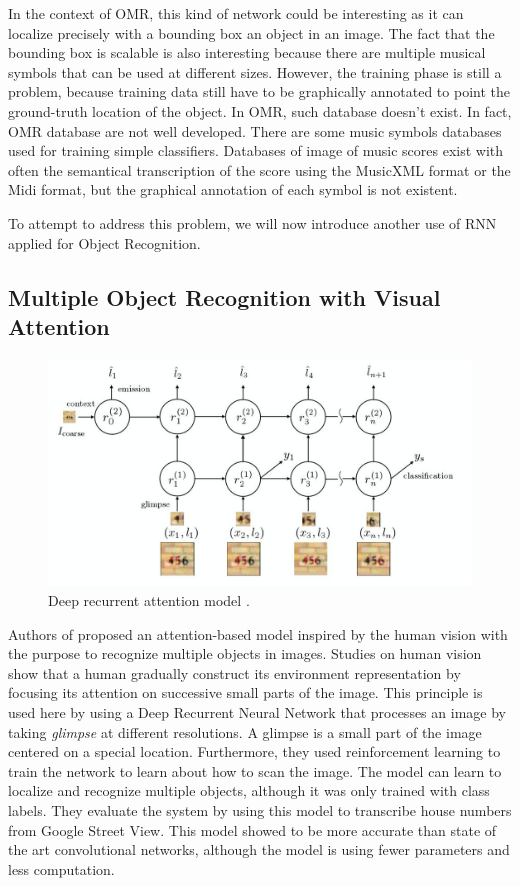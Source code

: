 \documentclass[11pt]{sdm}
\begin{document}
In the context of OMR, this kind of network could be interesting as it can localize precisely with a bounding box an object in an image.
The fact that the bounding box is scalable is also interesting because there are multiple musical symbols that can be used at different sizes.
However, the training phase is still a problem, because training data still have to be graphically annotated to point the ground-truth location of the object.
In OMR, such database doesn't exist.
In fact, OMR database are not well developed.
There are some music symbols databases used for training simple classifiers.
Databases of image of music scores exist with often the semantical transcription of the score using the MusicXML format or the Midi format, but the graphical annotation of each symbol is not existent.

To attempt to address this problem, we will now introduce another use of RNN applied for Object Recognition.

\subsection{Multiple Object Recognition with Visual Attention}

\begin{figure}[btp]
  \centering
  \includegraphics[scale=1]{img/attention_model}
  \caption{\label{attention_model} Deep recurrent attention model \cite{ba_multiple_2014}. }
\end{figure}

Authors of \cite{ba_multiple_2014} proposed an attention-based model inspired by the human vision with the purpose to recognize multiple objects in images.
Studies on human vision show that a human gradually construct its environment representation by focusing its attention on successive small parts of the image.
This principle is used here by using a Deep Recurrent Neural Network that processes an image by taking \textit{glimpse} at different resolutions.
A glimpse is a small part of the image centered on a special location.
Furthermore, they used reinforcement learning to train the network to learn about how to scan the image.
The model can learn to localize and recognize multiple objects, although it was only trained with class labels.
They evaluate the system by using this model to transcribe house numbers from Google Street View.
This model showed to be more accurate than state of the art convolutional networks, although the model is using fewer parameters and less computation.
\end{document}
